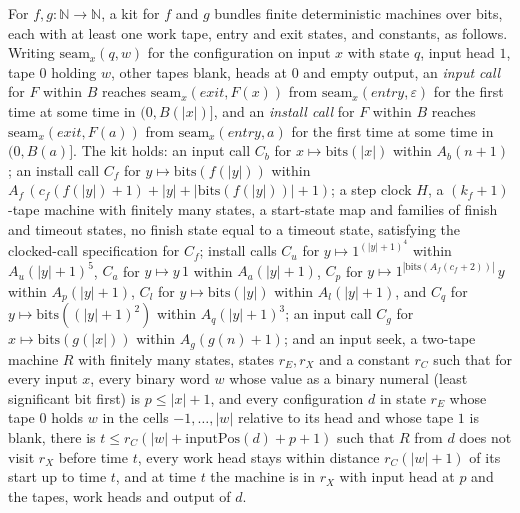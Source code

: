 \begin{definition}
\label{Turing.NTimeDiag.QyKit}
\leanok
{}
For $f, g : \mathbb{N} \to \mathbb{N}$, a kit for $f$ and $g$ bundles finite deterministic machines
over bits, each with at least one work tape, entry and exit states, and constants, as follows.
Writing $\mathrm{seam}_x(q, w)$ for the configuration on input $x$ with state $q$, input head $1$,
tape $0$ holding $w$, other tapes blank, heads at $0$ and empty output, an \emph{input call} for
$F$ within $B$ reaches $\mathrm{seam}_x(\mathit{exit}, F(x))$ from
$\mathrm{seam}_x(\mathit{entry}, \varepsilon)$ for the first time at some time in $(0, B(|x|)]$,
and an \emph{install call} for $F$ within $B$ reaches $\mathrm{seam}_x(\mathit{exit}, F(a))$ from
$\mathrm{seam}_x(\mathit{entry}, a)$ for the first time at some time in $(0, B(a)]$. The kit holds:
an input call $C_b$ for $x \mapsto \mathrm{bits}(|x|)$ within $A_b(n + 1)$; an install call $C_f$
for $y \mapsto \mathrm{bits}(f(|y|))$ within
$A_f\,(c_f(f(|y|) + 1) + |y| + |\mathrm{bits}(f(|y|))| + 1)$; a step clock $H$, a $(k_f + 1)$-tape
machine with finitely many states, a start-state map and families of finish and timeout states,
no finish state equal to a timeout state, satisfying the clocked-call specification for $C_f$;
install calls $C_u$ for $y \mapsto 1^{(|y|+1)^4}$ within $A_u(|y|+1)^5$, $C_a$ for
$y \mapsto y\,1$ within $A_a(|y|+1)$, $C_p$ for $y \mapsto 1^{|\mathrm{bits}(A_f(c_f + 2))|}\,y$
within $A_p(|y|+1)$, $C_l$ for $y \mapsto \mathrm{bits}(|y|)$ within $A_l(|y|+1)$, and $C_q$ for
$y \mapsto \mathrm{bits}((|y|+1)^2)$ within $A_q(|y|+1)^3$; an input call $C_g$ for
$x \mapsto \mathrm{bits}(g(|x|))$ within $A_g(g(n) + 1)$; and an input seek, a two-tape machine
$R$ with finitely many states, states $r_E, r_X$ and a constant $r_C$ such that for every input
$x$, every binary word $w$ whose value as a binary numeral (least significant bit first) is
$p \le |x| + 1$, and every configuration $d$ in state $r_E$ whose tape $0$ holds $w$ in the cells
$-1, \dots, |w|$ relative to its head and whose tape $1$ is blank, there is
$t \le r_C(|w| + \mathrm{inputPos}(d) + p + 1)$ such that $R$ from $d$ does not visit $r_X$ before
time $t$, every work head stays within distance $r_C(|w| + 1)$ of its start up to time $t$, and at
time $t$ the machine is in $r_X$ with input head at $p$ and the tapes, work heads and output of $d$.
\end{definition}

